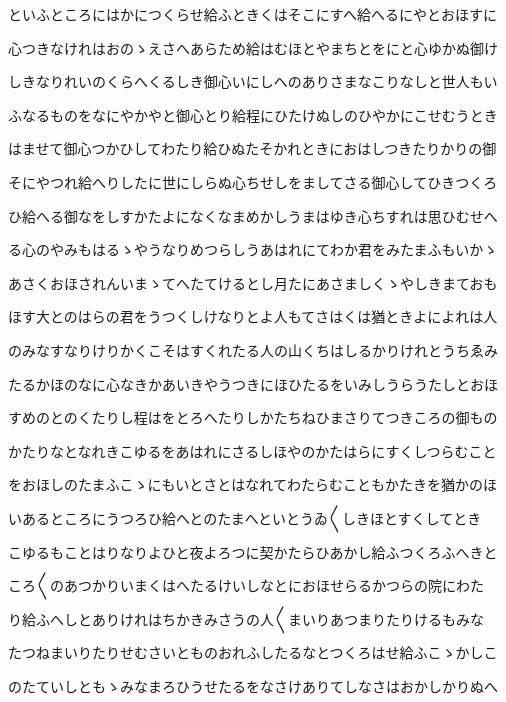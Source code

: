 \documentclass[a4paper,11pt,landscape]{ltjtarticle}
\begin{document}
\par\medskip
といふところにはかにつくらせ給ふときくはそこにすへ給へるにやとおほすに
\par\medskip
心つきなけれはおのゝえさへあらため給はむほとやまちとをにと心ゆかぬ御け
\par\medskip
しきなりれいのくらへくるしき御心いにしへのありさまなこりなしと世人もい
\par\medskip
ふなるものをなにやかやと御心とり給程にひたけぬしのひやかにこせむうとき
\par\medskip
はませて御心つかひしてわたり給ひぬたそかれときにおはしつきたりかりの御
\par\medskip
そにやつれ給へりしたに世にしらぬ心ちせしをましてさる御心してひきつくろ
\par\medskip
ひ給へる御なをしすかたよになくなまめかしうまはゆき心ちすれは思ひむせへ
\par\medskip
る心のやみもはるゝやうなりめつらしうあはれにてわか君をみたまふもいかゝ
\par\medskip
あさくおほされんいまゝてへたてけるとし月たにあさましくゝやしきまておも
\par\medskip
ほす大とのはらの君をうつくしけなりとよ人もてさはくは猶ときよによれは人
\par\medskip
のみなすなりけりかくこそはすくれたる人の山くちはしるかりけれとうちゑみ
\par\medskip
たるかほのなに心なきかあいきやうつきにほひたるをいみしうらうたしとおほ
\par\medskip
すめのとのくたりし程はをとろへたりしかたちねひまさりてつきころの御もの
\par\medskip
かたりなとなれきこゆるをあはれにさるしほやのかたはらにすくしつらむこと
\par\medskip
をおほしのたまふこゝにもいとさとはなれてわたらむこともかたきを猶かのほ
\par\medskip
いあるところにうつろひ給へとのたまへといとうゐ〱しきほとすくしてとき
\par\medskip
こゆるもことはりなりよひと夜よろつに契かたらひあかし給ふつくろふへきと
\par\medskip
ころ〱のあつかりいまくはへたるけいしなとにおほせらるかつらの院にわた
\par\medskip
り給ふへしとありけれはちかきみさうの人〱まいりあつまりたりけるもみな
\par\medskip
たつねまいりたりせむさいとものおれふしたるなとつくろはせ給ふこゝかしこ
\par\medskip
のたていしともゝみなまろひうせたるをなさけありてしなさはおかしかりぬへ
\par\medskip
\end{document}
